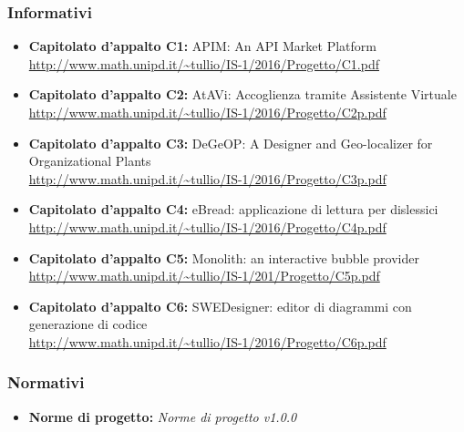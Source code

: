     \subsubsection{Informativi}
      \begin{itemize}
        \item \textbf{Capitolato d'appalto C1:} APIM: An API Market Platform \\
        \url{http://www.math.unipd.it/~tullio/IS-1/2016/Progetto/C1.pdf}
        \item \textbf{Capitolato d'appalto C2:} AtAVi: Accoglienza tramite Assistente Virtuale \\
        \url{http://www.math.unipd.it/~tullio/IS-1/2016/Progetto/C2p.pdf}
        \item \textbf{Capitolato d'appalto C3:} DeGeOP: A Designer and Geo-localizer  for
        Organizational Plants \\
        \url{http://www.math.unipd.it/~tullio/IS-1/2016/Progetto/C3p.pdf}
        \item \textbf{Capitolato d'appalto C4:} eBread: applicazione di lettura per dislessici \\
        \url{http://www.math.unipd.it/~tullio/IS-1/2016/Progetto/C4p.pdf}
        \item \textbf{Capitolato d'appalto C5:} Monolith: an interactive bubble provider \\
        \url{http://www.math.unipd.it/~tullio/IS-1/201/Progetto/C5p.pdf}
        \item \textbf{Capitolato d'appalto C6:} SWEDesigner: editor di diagrammi  con generazione di codice \\
        \url{http://www.math.unipd.it/~tullio/IS-1/2016/Progetto/C6p.pdf}
      \end{itemize}
    \subsubsection{Normativi}
      \begin{itemize}
        \item \textbf{Norme di progetto:} \emph{Norme di progetto v1.0.0}
      \end{itemize}
